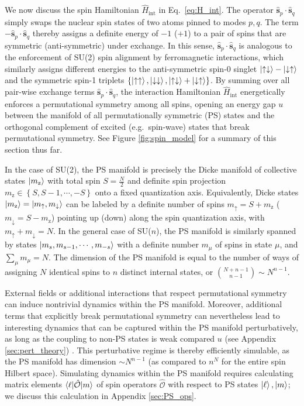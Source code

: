 \documentclass[aps,pra,nofootinbib,twocolumn,superscriptaddress]{revtex4-2}
\renewcommand{\t}{\text} %
\renewcommand{\set}[1]{\left\{#1\right\}} %
\newcommand{\bk}{\braket} %
\newcommand{\1}{\mathds{1}}
\newcommand{\s}{\hat{s}}
\renewcommand{\H}{\hat{H}}
\renewcommand{\O}{\hat{\mathcal{O}}}
\newcommand{\up}{\uparrow}
\newcommand{\dn}{\downarrow}
\newcommand{\z}{\text{z}}
\begin{document}
We now discuss the spin Hamiltonian $\H_{\t{int}}$ in Eq.~\eqref{eq:H_int}.
The operator $\bm\s_p\cdot\bm\s_q$ simply swaps the nuclear spin states of two atoms pinned to modes $p,q$.
The term $-\bm\s_p\cdot\bm\s_q$ thereby assigns a definite energy of $-1$ ($+1$) to a pair of spins that are symmetric (anti-symmetric) under exchange.
In this sense, $\bm\s_p\cdot\bm\s_q$ is analogous to the enforcement of SU(2) spin alignment by ferromagnetic interactions, which similarly assigns different energies to the anti-symmetric spin-0 singlet $\ket{\up\dn}-\ket{\dn\up}$ and the symmetric spin-1 triplets $\set{\ket{\up\up},\ket{\dn\dn},\ket{\up\dn}+\ket{\dn\up}}$.
By summing over all pair-wise exchange terms $\bm\s_p\cdot\bm\s_q$, the interaction Hamiltonian $\H_{\t{int}}$ energetically enforces a permutational symmetry among all spins, opening an energy gap $u$ between the manifold of all permutationally symmetric (PS) states and the orthogonal complement of excited (e.g.~spin-wave) states that break permutational symmetry.
See Figure \ref{fig:spin_model} for a summary of this section thus far.

In the case of SU(2), the PS manifold is precisely the Dicke manifold of collective states $\ket{m_\z}$ with total spin $S=\frac{N}{2}$ and definite spin projection $m_\z\in\set{S,S-1,\cdots,-S}$ onto a fixed quantization axis.
Equivalently, Dicke states $\ket{m_\z}=\ket{m_\up,m_\dn}$ can be labeled by a definite number of spins $m_\up=S+m_\z$ ($m_\dn=S-m_\z$) pointing up (down) along the spin quantization axis, with $m_\up+m_\dn=N$.
In the general case of SU($n$), the PS manifold is similarly spanned by states $\ket{m_s,m_{s-1},\cdots,m_{-s}}$ with a definite number $m_\mu$ of spins in state $\mu$, and $\sum_\mu m_\mu=N$.
The dimension of the PS manifold is equal to the number of ways of assigning $N$ identical spins to $n$ distinct internal states, or ${N+n-1 \choose n-1} \sim N^{n-1}$.

External fields or additional interactions that respect permutational symmetry can induce nontrivial dynamics within the PS manifold.
Moreover, additional terms that explicitly break permutational symmetry can nevertheless lead to interesting dynamics that can be captured within the PS manifold perturbatively, as long as the coupling to non-PS states is weak compared $u$ (see Appendix \ref{sec:pert_theory}) \cite{bravyi2011schrieffer}.
This perturbative regime is thereby efficiently simulable, as the PS manifold has dimension $\sim N^{n-1}$ (as compared to $n^N$ for the entire spin Hilbert space).
Simulating dynamics within the PS manifold requires calculating matrix elements $\bk{\ell|\O|m}$ of spin operators $\O$ with respect to PS states $\ket\ell,\ket{m}$; we discuss this calculation in Appendix \ref{sec:PS_ops}.
\end{document}
